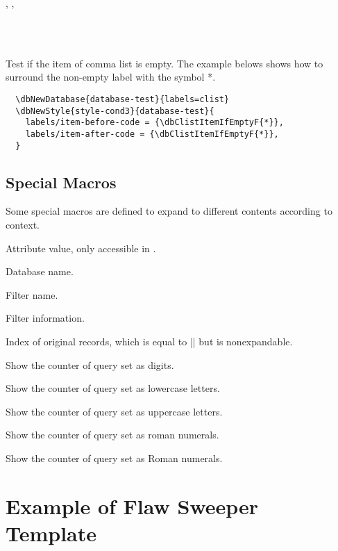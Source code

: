 \documentclass[full]{l3doc}
\begin{document}
\begin{documentation}
\begin{function}{\dbClistItemIfEmptyT, \dbClistItemIfEmptyF, \dbClistItemIfEmptyTF}
  \begin{syntax}
       \\
      \\
     
  \end{syntax}

  Test if the item of comma list is empty. The example belows shows how to
  surround the non-empty label with the symbol *.
\end{function}

\begin{verbatim}
  \dbNewDatabase{database-test}{labels=clist}
  \dbNewStyle{style-cond3}{database-test}{
    labels/item-before-code = {\dbClistItemIfEmptyF{*}},
    labels/item-after-code = {\dbClistItemIfEmptyF{*}},
  }
\end{verbatim}

\subsection{Special Macros}

Some special macros are defined to expand to different contents according to context.

\DescribeMacro{\dbval} Attribute value, only accessible in .

\DescribeMacro{\dbDatabase} Database name.

\DescribeMacro{\dbFilterName} Filter name.

\DescribeMacro{\dbFilterInfo} Filter information.

\DescribeMacro{\dbIndex} Index of original records, which is equal to || but  is nonexpandable.


\DescribeMacro{\dbarabic} Show the counter of query set as digits.

\DescribeMacro{\dbalph} Show the counter of query set as lowercase letters.

\DescribeMacro{\dbAlph} Show the counter of query set as uppercase letters.

\DescribeMacro{\dbroman} Show the counter of query set as roman numerals.

\DescribeMacro{\dbRoman} Show the counter of query set as Roman numerals.

\section{Example of Flaw Sweeper Template}
\label{sec:example}


\end{documentation}
\end{document}
